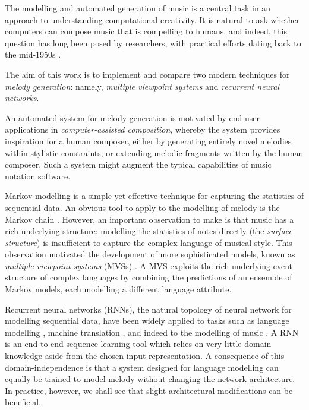\documentclass[12pt,a4paper,twoside,openright]{report}
\begin{document}
\vspace{2mm}
The modelling and automated generation of music is a central task in an approach
to understanding computational creativity. It is natural to ask whether
computers can compose music that is compelling to humans, and indeed, this
question has long been posed by researchers, with practical efforts dating back
to the mid-1950s \cite{ames1987automated}. 

The aim of this work is to implement and compare two modern techniques for
\emph{melody generation}: namely, \emph{multiple viewpoint systems} and
\emph{recurrent neural networks}.

An automated system for melody generation is motivated by end-user applications
in \emph{computer-assisted composition}, whereby the system provides inspiration
for a human composer, either by generating entirely novel melodies within
stylistic constraints, or extending melodic fragments written by the human
composer. Such a system might augment the typical capabilities of music notation
software. 

Markov modelling is a simple yet effective technique for capturing the
statistics of sequential data. An obvious tool to apply to the modelling of
melody is the Markov chain \cite{ames1989markov}. However, an important
observation to make is that music has a rich underlying structure: modelling the
statistics of notes directly (the \emph{surface structure}) is insufficient to
capture the complex language of musical style. This observation motivated the
development of more sophisticated models, known as \emph{multiple viewpoint
systems} (MVSs) \cite{conklin1995viewpoints}. A MVS exploits the rich underlying
event structure of complex languages by combining the predictions of an ensemble
of Markov models, each modelling a different language attribute.

Recurrent neural networks (RNNs), the natural topology of neural network for
modelling sequential data, have been widely applied to tasks such as language
modelling \cite{graves2013generating}, machine translation
\cite{sutskever2014sequence}, and indeed to the modelling of music
\cite{boulanger2012modeling}. A RNN is an end-to-end sequence learning tool
which relies on very little domain knowledge aside from the chosen input
representation. A consequence of this domain-independence is that a system
designed for language modelling can equally be trained to model melody without
changing the network architecture. In practice, however, we shall see that
slight architectural modifications can be beneficial.
\end{document}
